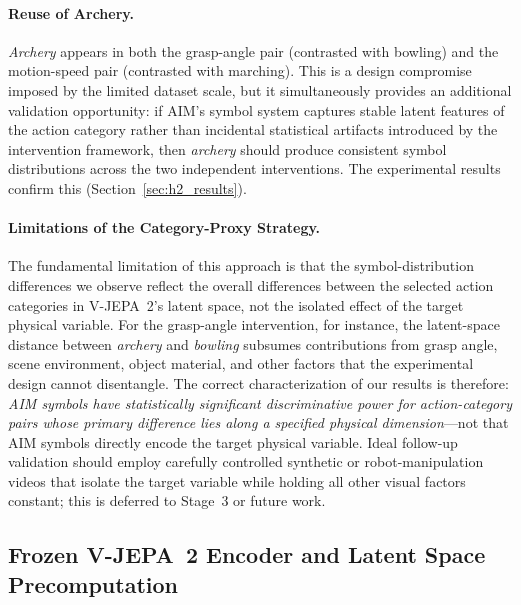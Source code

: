\documentclass{article}
\begin{document}
\paragraph{Reuse of Archery.}
\textit{Archery} appears in both the grasp-angle pair (contrasted with bowling)
and the motion-speed pair (contrasted with marching).  This is a design
compromise imposed by the limited dataset scale, but it simultaneously provides
an additional validation opportunity: if AIM's symbol system captures stable
latent features of the action category rather than incidental statistical
artifacts introduced by the intervention framework, then \textit{archery} should
produce consistent symbol distributions across the two independent interventions.
The experimental results confirm this (Section~\ref{sec:h2_results}).

\paragraph{Limitations of the Category-Proxy Strategy.}
The fundamental limitation of this approach is that the symbol-distribution
differences we observe reflect the overall differences between the selected
action categories in V-JEPA~2's latent space, not the isolated effect of the
target physical variable.  For the grasp-angle intervention, for instance, the
latent-space distance between \textit{archery} and \textit{bowling} subsumes
contributions from grasp angle, scene environment, object material, and other
factors that the experimental design cannot disentangle.  The correct
characterization of our results is therefore: \emph{AIM symbols have
statistically significant discriminative power for action-category pairs whose
primary difference lies along a specified physical dimension}---not that AIM
symbols directly encode the target physical variable.  Ideal follow-up
validation should employ carefully controlled synthetic or robot-manipulation
videos that isolate the target variable while holding all other visual factors
constant; this is deferred to Stage~3 or future work.

\subsection{Frozen V-JEPA~2 Encoder and Latent Space Precomputation}\label{sec:frozen_encoder}
\end{document}
